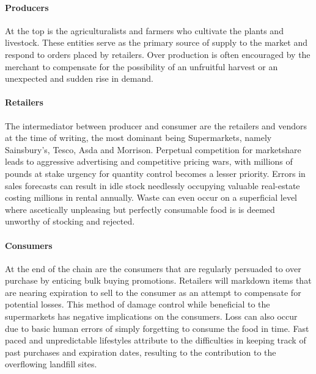 \documentclass[a4paper, 11pt]{article}
\begin{document}
\paragraph{Producers}At the top is the agriculturalists and farmers who cultivate the plants and livestock. These entities serve as the primary source of supply to the market and respond to orders placed by retailers. Over production is often encouraged by the merchant to compensate for the possibility of an unfruitful harvest or an unexpected and sudden rise in demand.\cite{waste} 

\paragraph{Retailers}The intermediator between producer and consumer are the retailers and vendors at the time of writing, the most dominant being Supermarkets, namely Sainsbury's, Tesco, Asda and Morrison. Perpetual competition for marketshare leads to aggressive advertising and competitive pricing wars, with millions of pounds at stake urgency for quantity control becomes a lesser priority. Errors in sales forecasts can result in idle stock needlessly occupying valuable real-estate costing millions in rental annually. Waste can even occur on a superficial level where ascetically unpleasing but perfectly consumable food is is deemed unworthy of stocking and rejected.\cite{FoodWaste} 

\paragraph{Consumers}At the end of the chain are the consumers that are regularly persuaded to over purchase by enticing bulk buying promotions. Retailers will markdown items that are nearing expiration to sell to the consumer as an attempt to compensate for potential losses. This method of damage control while beneficial to the supermarkets has negative implications on the consumers. Loss can also occur due to basic human errors of simply forgetting to consume the food in time. Fast paced and unpredictable lifestyles attribute to the difficulties in keeping track of past purchases and expiration dates, resulting to the contribution to the overflowing landfill sites.\cite{FoodWaste} 

\vspace{\baselineskip}
\end{document}
